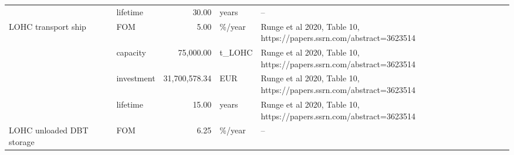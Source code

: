 \begin{longtable}{p{5cm}p{3cm}rp{3cm}p{11cm}}
                      & lifetime &          30.00 &                             years &                                                                                                                                                                                                                                                                                                                                   -- \\
LOHC transport ship & FOM &           5.00 &                            \%/year &                                                                                                                                                                                                                                                                 Runge et al 2020, Table 10, https://papers.ssrn.com/abstract=3623514 \\
                      & capacity &      75,000.00 &                            t\_LOHC &                                                                                                                                                                                                                                                                 Runge et al 2020, Table 10, https://papers.ssrn.com/abstract=3623514 \\
                      & investment &  31,700,578.34 &                               EUR &                                                                                                                                                                                                                                                                 Runge et al 2020, Table 10, https://papers.ssrn.com/abstract=3623514 \\
                      & lifetime &          15.00 &                             years &                                                                                                                                                                                                                                                                 Runge et al 2020, Table 10, https://papers.ssrn.com/abstract=3623514 \\
LOHC unloaded DBT storage & FOM &           6.25 &                            \%/year &                                                                                                                                                                                                                                                                                                                                   -- \\

\end{longtable}
